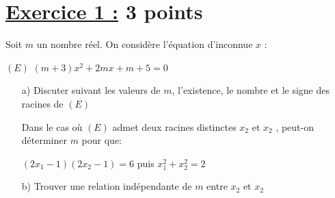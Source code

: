 \documentclass[12pt,a4paper]{article}
\begin{document}
\renewcommand{\arraystretch}{1.5}
\renewcommand{\arrayrulewidth}{1.2pt}
\newcommand{\encercle}[1]{\tikz[baseline=(X.base)] \node (X) [draw, circle, inner sep=1pt] {#1};}
\vspace{3cm}

\section*{\underline{Exercice 1 :} 3 points}
Soit \( m \) un nombre réel. On considère l’équation d’inconnue \( x \) :

\( (E) \) \( (m+3)x^{2} +2mx + m + 5 = 0\)
\begin{enumerate}

\item[a)] Discuter suivant les valeurs de \( m \), l’existence, le nombre et le signe des racines de \( (E) \) 

Dans le cas où \( (E) \) admet deux racines distinctes \( x_{2} \) et \( x_{2} \) , peut-on déterminer \( m \) pour que:

\( ( 2x_{1} - 1 ) (2x_{2}-1) = 6 \) puis \( x_{1}^{2} + x_{2}^{2} = 2 \)

\item[b)]Trouver une relation indépendante de \( m \) entre \( x_{2} \) et \( x_{2} \)
\end{enumerate}
\end{document}
